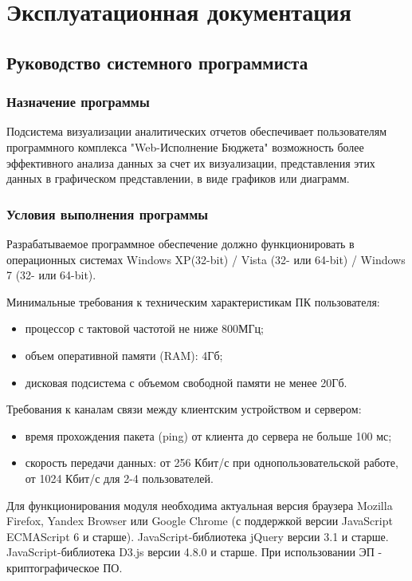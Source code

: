 \documentclass[a4paper]{extarticle}
\numberwithin{equation}{section}
\begin{document}
\newpage
\section{Эксплуатационная документация}

\subsection{Руководство системного программиста}

\subsubsection{Назначение программы}
Подсистема визуализации аналитических отчетов обеспечивает пользователям программного комплекса "Web-Исполнение Бюджета" возможность более эффективного анализа данных за счет их визуализации, представления этих данных в графическом представлении, в виде графиков или диаграмм.

\subsubsection{Условия выполнения программы}
Разрабатываемое программное обеспечение должно функционировать в операционных системах Windows XP(32-bit) / Vista (32- или 64-bit) / Windows 7 (32- или 64-bit).\par
Минимальные требования к техническим характеристикам ПК пользователя:\par
\begin{itemize}
  \item процессор с тактовой частотой не ниже 800МГц;
  \item объем оперативной памяти (RAM): 4Гб;
  \item дисковая подсистема с объемом свободной памяти не менее 20Гб.
\end{itemize}\par
Требования к каналам связи между клиентским устройством и сервером:\par
\begin{itemize}
  \item время прохождения пакета (ping) от клиента до сервера не больше 100 мс;
  \item скорость передачи данных: от 256 Кбит/с при однопользовательской работе, от 1024 Кбит/с для 2-4 пользователей.
\end{itemize}\par
Для функционирования модуля необходима актуальная версия браузера Mozilla Firefox, Yandex Browser или Google Chrome (с поддержкой версии JavaScript ECMAScript 6 и старше). JavaScript-библиотека jQuery версии 3.1 и старше. JavaScript-библиотека D3.js версии 4.8.0 и старше. При использовании ЭП - криптографическое ПО.
\end{document}
